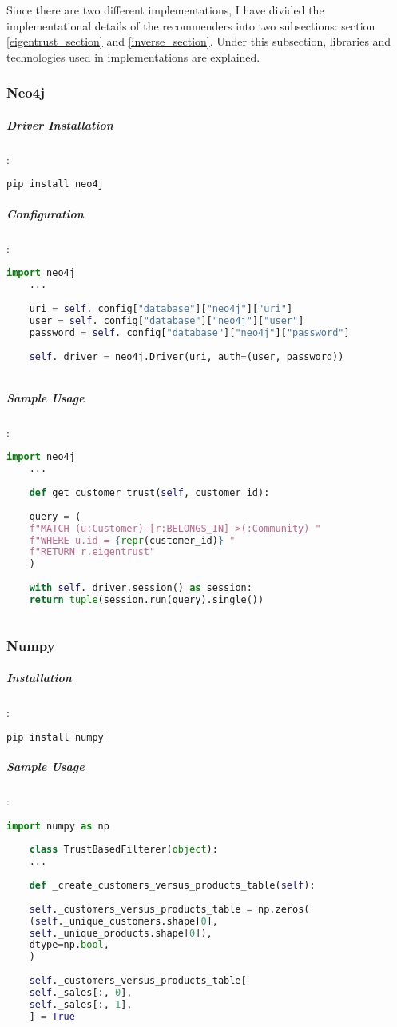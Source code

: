 	Since there are two different implementations, I have divided the implementational details of the recommenders into two subsections: section \ref{eigentrust_section} and \ref{inverse_section}. Under this subsection, libraries and technologies used in implementations are explained.
	\subsubsection{Neo4j \cite{Neo4j}}
	\subparagraph{Driver Installation}:
	\begin{lstlisting}[language=bash]
	pip install neo4j
	\end{lstlisting}
	
	\subparagraph{Configuration}:
	\begin{lstlisting}[language=python]
	import neo4j
	...
	
	uri = self._config["database"]["neo4j"]["uri"]
	user = self._config["database"]["neo4j"]["user"]
	password = self._config["database"]["neo4j"]["password"]
	
	self._driver = neo4j.Driver(uri, auth=(user, password))
	
	\end{lstlisting}
	
	\subparagraph{Sample Usage}:
	\begin{lstlisting}[language=python, caption=Neo4j driver example]
	import neo4j
	...
	
	def get_customer_trust(self, customer_id):
	
	query = (
	f"MATCH (u:Customer)-[r:BELONGS_IN]->(:Community) "
	f"WHERE u.id = {repr(customer_id)} "
	f"RETURN r.eigentrust"
	)
	
	with self._driver.session() as session:
	return tuple(session.run(query).single())
	
	\end{lstlisting}
	
	\subsubsection{Numpy \cite{Numpy}}
	\subparagraph{Installation}:
	\begin{lstlisting}[language=bash]
	pip install numpy
	\end{lstlisting}
	
	\subparagraph{Sample Usage}:
	\begin{lstlisting}[language=python, caption=Numpy example]
	import numpy as np
	
	class TrustBasedFilterer(object):
	...
	
	def _create_customers_versus_products_table(self):
	
	self._customers_versus_products_table = np.zeros(
	(self._unique_customers.shape[0],
	self._unique_products.shape[0]),
	dtype=np.bool,
	)
	
	self._customers_versus_products_table[
	self._sales[:, 0],
	self._sales[:, 1],
	] = True
	\end{lstlisting}
	
